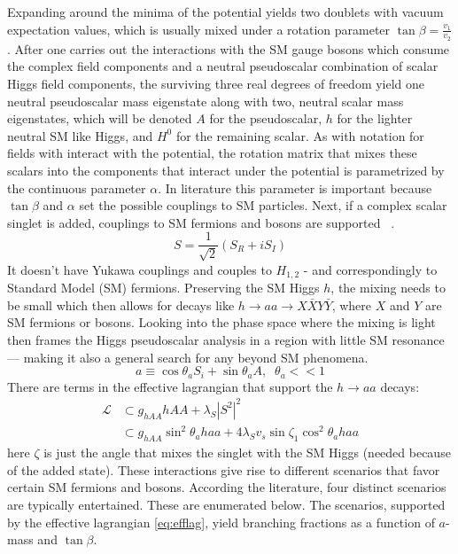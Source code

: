 Expanding around the minima of the potential yields two doublets with vacuum expectation values, which is usually mixed under a rotation parameter $\tan \beta = \frac{v_1}{v_2}$. After one carries out the interactions with the SM gauge bosons which consume the complex field components and a neutral pseudoscalar combination of scalar Higgs field components, the surviving three real degrees of freedom yield one neutral pseudoscalar mass eigenstate along with two, neutral scalar mass eigenstates, which will be denoted $A$ for the pseudoscalar, $h$ for the lighter neutral SM like Higgs, and $H^0$ for the remaining scalar. As with notation for fields with interact with the potential, the rotation matrix that mixes these scalars into the components that interact under the potential is parametrized by the continuous parameter $\alpha$. In literature this parameter is important because $\tan \beta$ and $\alpha$ set the possible couplings to SM particles. Next, if a complex scalar singlet is added, couplings to SM fermions and bosons are supported ~\cite{Curtin_2014}.
\[S = \frac{1}{\sqrt{2}}(S_R + iS_I)\]
It doesn't have Yukawa couplings and couples to $H_{1,2}$ - and correspondingly to Standard Model (SM) fermions. Preserving the SM Higgs $h$, the mixing needs to be small which then allows for decays like $h\rightarrow aa \rightarrow X\bar{X}Y\bar{Y}$, where $X$ and $Y$ are SM fermions or bosons. Looking into the phase space where the mixing is light then frames the Higgs pseudoscalar analysis in a region with little SM resonance --- making it also a general search for any beyond SM phenomena.
\[a \equiv \cos \theta_a S_i + \sin \theta_a A ,\;\; \theta_a << 1 \]
There are terms in the effective lagrangian that support the $h \rightarrow aa $ decays:
\begin{align}
\label{eq:efflag}
\mathcal{L} &\subset g_{hAA}hAA + \lambda_S|S^2|^2  \\
            &\subset g_{hAA}\sin^2\theta_a haa + 4\lambda_S v_s \sin{\zeta_1} \cos^2\theta_a haa \nonumber 
\end{align}
here $\zeta$ is just the angle that mixes the singlet with the SM Higgs (needed because of the added state). These interactions give rise to different scenarios that favor certain SM fermions and bosons. According the literature, four distinct scenarios are typically entertained. These are enumerated below. The scenarios, supported by the effective lagrangian \ref{eq:efflag}, yield branching fractions as a function of $a$-mass and $\tan\beta$.  
